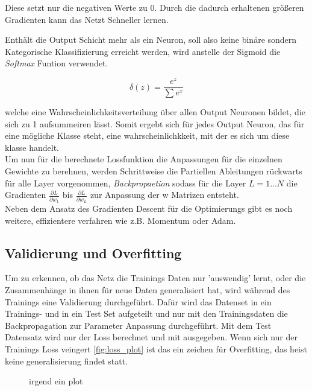 Diese setzt nur die negativen Werte zu 0. Durch die dadurch erhaltenen
größeren Gradienten kann das Netzt Schneller lernen.


Enthält die Output Schicht mehr als ein Neuron, soll also keine binäre sondern 
Kategorische Klassifizierung erreicht werden, wird anstelle der Sigmoid 
die \textit{Softmax} Funtion verwendet.


\begin{equation}
    \label{eq:softmax}
    \delta(z) = \frac{e^{z}}{\sum e^{x}}
\end{equation}

welche eine Wahrscheinlichkeitsverteilung über allen Output 
Neuronen bildet, die sich zu 1 aufsummeiren lässt. Somit ergebt sich
für jedes Output Neuron, das für eine mögliche Klasse steht, eine 
wahrscheinlichkkeit, mit der es sich um diese klasse handelt.
\\
Um nun für die berechnete Lossfunktion die Anpassungen für die 
einzelnen Gewichte zu berehnen, werden Schrittweise die Partiellen
Ableitungen rückwarts für alle Layer vorgenommen, \textit{Backpropaetion}
sodass für die Layer $L = 1...N$ die Gradienten $\frac{\partial L}{\partial 
w_{1}}$ bis $\frac{\partial L}{\partial w_{L}}$ zur Anpassung 
der w Matrizen entsteht.
\\
Neben dem Ansatz des Gradienten Descent für die Optimierungs 
gibt es noch weitere, effizientere verfahren wie z.B. Momentum oder Adam.


\subsection{Validierung und Overfitting}


Um zu erkennen, ob das Netz die Trainings Daten nur 'auswendig' lernt, oder die 
Zusammenhänge in ihnen für neue Daten generalisiert hat, wird während des Trainings 
eine Validierung durchgeführt. Dafür wird das Datenset in ein Trainings- und in 
ein Test Set aufgeteilt und nur mit den Trainingsdaten die Backpropagation zur 
Parameter Anpassung durchgeführt. Mit dem Test Datensatz wird nur der Loss berechnet und
mit ausgegeben. Wenn sich nur der Trainings Loss veingert \ref{fig:loss_plot} ist das ein zeichen 
für Overfitting, das heist keine generalisierung findet statt. 


\begin{figure}[htb]
    \centering
    
    \caption{irgend ein plot}
    \label{fig:ptl}
\end{figure}

